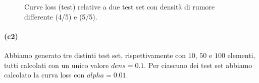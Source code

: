 \documentclass[a4paper,12pt]{article}
\begin{document}
\begin{figure}[htp]
    \centering

    \medskip


    \caption{Curve loss (test) relative a due test set con densità di rumore differente (4/5) e (5/5).}
    \label{fig:c1-3}
\end{figure}


\newpage
\paragraph{(c2)} Abbiamo generato tre distinti test set, rispettivamente con $10$, $50$ e $100$ elementi, tutti calcolati con un unico valore $dens=0.1$. Per ciascuno dei test set abbiamo calcolato la curva loss con $alpha=0.01$.
\end{document}
